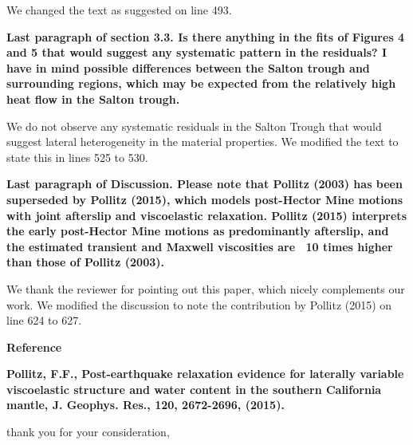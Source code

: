 \documentclass[10pt,a4paper]{letter}
\begin{document}
\begin{letter}{}
We changed the text as suggested on line 493.

\textbf{Last paragraph of section 3.3. Is there anything in the fits of Figures 4 and 5 that would suggest any systematic pattern in the residuals? I have in mind possible differences between the Salton trough and surrounding regions, which may be expected from the relatively high heat flow in the Salton trough.}

We do not observe any systematic residuals in the Salton Trough that would suggest lateral heterogeneity in the material properties.  We modified the text to state this in lines 525 to 530.

\textbf{Last paragraph of Discussion. Please note that Pollitz (2003) has been superseded by Pollitz (2015), which models post-Hector Mine motions with joint afterslip and viscoelastic relaxation. Pollitz (2015) interprets the early post-Hector Mine motions as predominantly afterslip, and the estimated transient and Maxwell viscosities are ~10 times higher than those of Pollitz (2003).}

We thank the reviewer for pointing out this paper, which nicely complements our work.  We modified the discussion to note the contribution by Pollitz (2015) on line 624 to 627.   

\textbf{Reference}

\textbf{Pollitz, F.F., Post-earthquake relaxation evidence for laterally variable viscoelastic structure and water content in the southern California mantle, J. Geophys. Res., 120, 2672-2696, (2015).}

\closing{thank you for your consideration,}
\end{letter}
\end{document}

